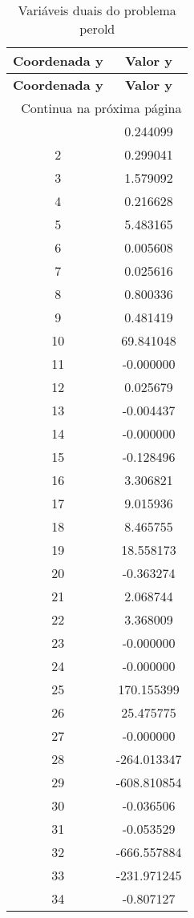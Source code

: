 \documentclass[12pt]{article}
\begin{document}
\begin{longtable}{@{}cc@{}}
\caption{Variáveis duais do problema perold} \\
\toprule
\textbf{Coordenada y} & \textbf{Valor y} \\
\midrule
\endfirsthead

\toprule
\textbf{Coordenada y} & \textbf{Valor y} \\
\midrule
\endhead

\midrule \multicolumn{2}{r}{{Continua na próxima página}} \\ \midrule
\endfoot

\bottomrule
\endlastfoot
1 & 0.244099 \\
2 & 0.299041 \\
3 & 1.579092 \\
4 & 0.216628 \\
5 & 5.483165 \\
6 & 0.005608 \\
7 & 0.025616 \\
8 & 0.800336 \\
9 & 0.481419 \\
10 & 69.841048 \\
11 & -0.000000 \\
12 & 0.025679 \\
13 & -0.004437 \\
14 & -0.000000 \\
15 & -0.128496 \\
16 & 3.306821 \\
17 & 9.015936 \\
18 & 8.465755 \\
19 & 18.558173 \\
20 & -0.363274 \\
21 & 2.068744 \\
22 & 3.368009 \\
23 & -0.000000 \\
24 & -0.000000 \\
25 & 170.155399 \\
26 & 25.475775 \\
27 & -0.000000 \\
28 & -264.013347 \\
29 & -608.810854 \\
30 & -0.036506 \\
31 & -0.053529 \\
32 & -666.557884 \\
33 & -231.971245 \\
34 & -0.807127 \\

\end{longtable}
\end{document}
